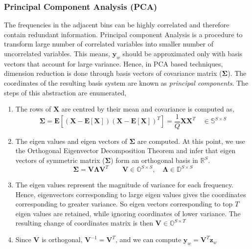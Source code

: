 \subsubsection{Principal Component Analysis (PCA)}
The frequencies in the adjacent bins can be highly correlated and therefore contain redundant information. Principal component Analysis is a procedure to transform large number of correlated variables into smaller number of uncorrelated variables. This means, $\textbf{y}_{w}$ should be approximated only with basis vectors that account for large variance. Hence, in PCA based techniques, dimension reduction is done through \gls{basis} vectors of covariance matrix ($\bm{\Sigma}$). The coordinates of the resulting basis system are known as \textit{principal components}. The steps of this abstraction are enumerated,
\begin{enumerate}[label=(\alph*)]
\item The rows of $\textbf{X}$ are centred by their mean and covariance is computed as,
\[
   \bm{\Sigma} = \textbf{E}[(\textbf{X} - \textbf{E}[\textbf{X}])(\textbf{X} - \textbf{E}[\textbf{X}])^{T}] = \frac{1}{Q}\textbf{\^X}\textbf{\^X}^{T} \quad \in \mathbb{S}^{S \times S}
\]
\item The eigen values and eigen vectors of $\bm{\Sigma}$ are computed. At this point, we use the \gls{Orthogonal Eigenvector Decomposition Theorem} and infer that eigen vectors of symmetric matrix ($\bm{\Sigma}$) form an orthogonal basis in $\mathbb{R}^{S}$. 
\[
\bm{\Sigma} = \textbf{V}\bm{\Lambda}\textbf{V}^{T} \qquad \textbf{V} \in \mathbb{O}^{S \times S}, \quad \bm{\Lambda} \in \mathbb{D}^{S \times S}
\]

\item The eigen values represent the magnitude of variance for each frequency.  Hence, eigenvectors corresponding to large eigen values gives the coordinates corresponding to greater variance. So eigen vectors corresponding to top $T$ eigen values are retained, while ignoring coordinates of lower variance. The resulting \gls{change of coordinates matrix} is then $\textbf{\^V} \in \mathbb{O}^{S \times T}$
   
\item Since $\textbf{\^V}$ is orthogonal, $\textbf{\^{V}}^{-1} = \textbf{\^{V}}^{T}$, and we can compute $\textbf{y}_{w} = \textbf{\^{V}}^{T}\textbf{z}_{w}$

\end{enumerate}   




